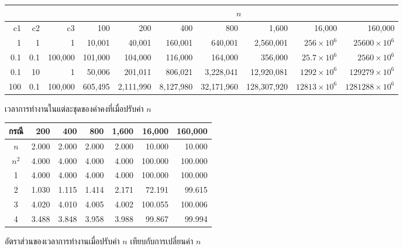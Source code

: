 \begin{figure}
{\small
\begin{center}
\begin{tabular}{|r|r|r|r|r|r|r|r|r|r|}
\hline
\multicolumn{3}{|c|}{} & \multicolumn{7}{c|}{$n$}\\
\hline
c1 & c2 & c3 & 100 & 200 & 400 & 800 & 1,600 & 16,000 & 160,000\\
\hline
1 & 1 & 1 & 10,001 & 40,001 & 160,001 & 640,001 & 2,560,001 & $256\times 10^6$ & $25600\times 10^6$ \\
0.1 & 0.1 & 100,000 & 101,000 & 104,000 & 116,000 & 164,000 & 356,000 & $25.7\times 10^6$ & $2560\times 10^6$ \\
0.1 & 10 & 1 & 50,006 & 201,011 & 806,021 & 3,228,041 & 12,920,081 & $1292\times 10^6$ & $129279\times 10^6$ \\
100 & 0.1 & 100,000 & 605,495 & 2,111,990 & 8,127,980 & 32,171,960 & 128,307,920 & $12813\times 10^6$ & $1281288\times 10^6$ \\

\hline
\end{tabular}
\end{center}
}
\caption{เวลา{\wbr}การ{\wbr}ทำงาน{\wbr}ใน{\wbr}แต่ละ{\wbr}ชุด{\wbr}ของ{\wbr}ค่าคงที่{\wbr}เมื่อ{\wbr}ปรับ{\wbr}ค่า $n$}
\label{fig:analysis-runtimes-by-n-2}
\end{figure}

\begin{figure}
{\small
\begin{center}
\begin{tabular}{|c|r|r|r|r|r|r|}
\hline
กรณี & 200 & 400 & 800 & 1,600 & 16,000 & 160,000\\
\hline
$n$ & 2.000 & 2.000 & 2.000 & 2.000 & 10.000 & 10.000\\
$n^2$ & 4.000 & 4.000 & 4.000 & 4.000 & 100.000 & 100.000\\
1 & 4.000 & 4.000 & 4.000 & 4.000 & 100.000 & 100.000\\
2 & 1.030 & 1.115 & 1.414 & 2.171 & 72.191 & 99.615\\
3 & 4.020 & 4.010 & 4.005 & 4.002 & 100.055 & 100.006\\
4 & 3.488 & 3.848 & 3.958 & 3.988 & 99.867 & 99.994\\
\hline
\end{tabular}
\end{center}
}
\caption{อัตราส่วน{\wbr}ของ{\wbr}เวลา{\wbr}การ{\wbr}ทำงาน{\wbr}เมื่อ{\wbr}ปรับ{\wbr}ค่า $n$ เทียบ{\wbr}กับ{\wbr}การ{\wbr}เปลี่ยน{\wbr}ค่า $n$}
\label{fig:analysis-runtimes-by-n-2-div}
\end{figure}

